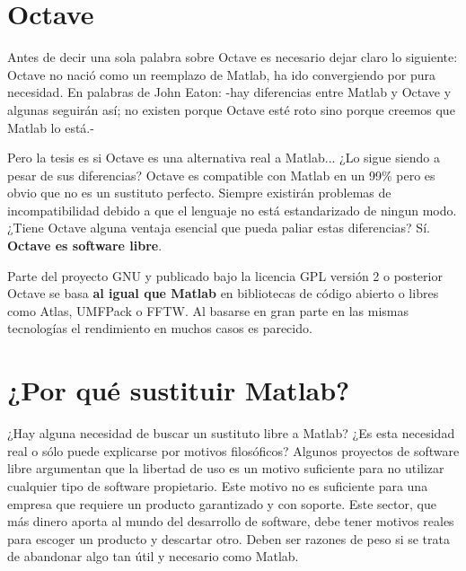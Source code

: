 \documentclass[10pt,letterpaper,conference]{ieeeconfspanish}
\begin{document}
\hypertarget{octave}{}
\section*{Octave}

Antes de decir una sola palabra sobre Octave es necesario dejar claro
lo siguiente: Octave no nació como un reemplazo de Matlab, ha ido
convergiendo por pura necesidad.  En palabras de John Eaton: -hay
diferencias entre Matlab y Octave y algunas seguirán así;  no existen
porque Octave esté roto sino porque creemos que Matlab lo está.-

Pero la tesis es si Octave es una alternativa real a Matlab... ¿Lo
sigue siendo a pesar de sus diferencias?  Octave es compatible con
Matlab en un 99{\%} pero es obvio que no es un sustituto perfecto.
Siempre existirán problemas de incompatibilidad debido a que el
lenguaje no está estandarizado de ningun modo. ¿Tiene Octave alguna
ventaja esencial que pueda paliar estas diferencias?  Sí.  \textbf{Octave es
software libre}.

Parte del proyecto GNU y publicado bajo la licencia GPL versión 2 o
posterior Octave se basa \textbf{al igual que Matlab} en bibliotecas de
código abierto o libres como Atlas, UMFPack o FFTW.  Al basarse en
gran parte en las mismas tecnologías el rendimiento en muchos casos es
parecido.



\hypertarget{por-qu-sustituir-matlab}{}
\section*{¿Por qué sustituir Matlab?}

¿Hay alguna necesidad de buscar un sustituto libre a Matlab? ¿Es esta
necesidad real o sólo puede explicarse por motivos filosóficos?
Algunos proyectos de software libre argumentan que la libertad de uso
es un motivo suficiente para no utilizar cualquier tipo de
software propietario.  Este motivo no es suficiente para una empresa
que requiere un producto garantizado y con soporte.  Este sector, que
más dinero aporta al mundo del desarrollo de software, debe tener
motivos reales para escoger un producto y descartar otro. Deben ser
razones de peso si se trata de abandonar algo tan útil y necesario
como Matlab.


\end{document}

